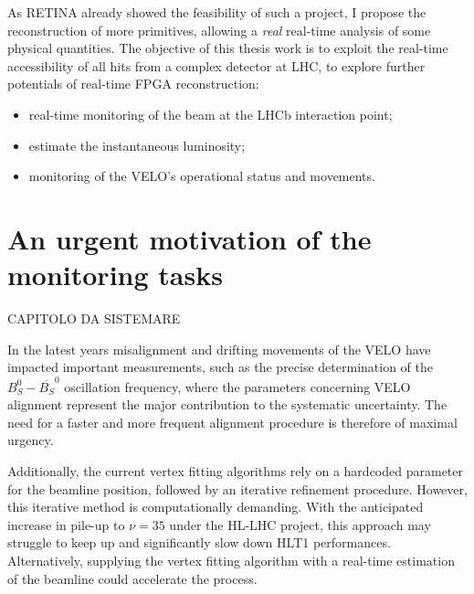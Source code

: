 As RETINA already showed the feasibility of such a project, I propose the reconstruction of more primitives, allowing a \textit{real} real-time analysis of some physical quantities. 
The objective of this thesis work is to exploit the real-time accessibility of all hits from a complex detector at LHC, to explore further potentials of real-time FPGA reconstruction: 
\begin{itemize}
\item real-time monitoring of the beam at the LHCb interaction point;
\item estimate the instantaneous luminosity;
\item monitoring of the VELO's operational status and movements.
\end{itemize}

\section{An urgent motivation of the monitoring tasks}

CAPITOLO DA SISTEMARE

In the latest years misalignment and drifting movements of the VELO have impacted important measurements, such as the precise determination of the $B_S^0-\overline{B_S} ^0$ oscillation frequency, where the parameters concerning VELO alignment represent the major contribution to the systematic uncertainty. The need for a faster and more frequent alignment procedure is therefore of maximal urgency.
    
Additionally, the current vertex fitting algorithms rely on a hardcoded parameter for the beamline position, followed by an iterative refinement procedure. However, this iterative method is computationally demanding. With the anticipated increase in pile-up to $\nu=35$ under the HL-LHC project, this approach may struggle to keep up and significantly slow down HLT1 performances. Alternatively, supplying the vertex fitting algorithm with a real-time estimation of the beamline could accelerate the process.

